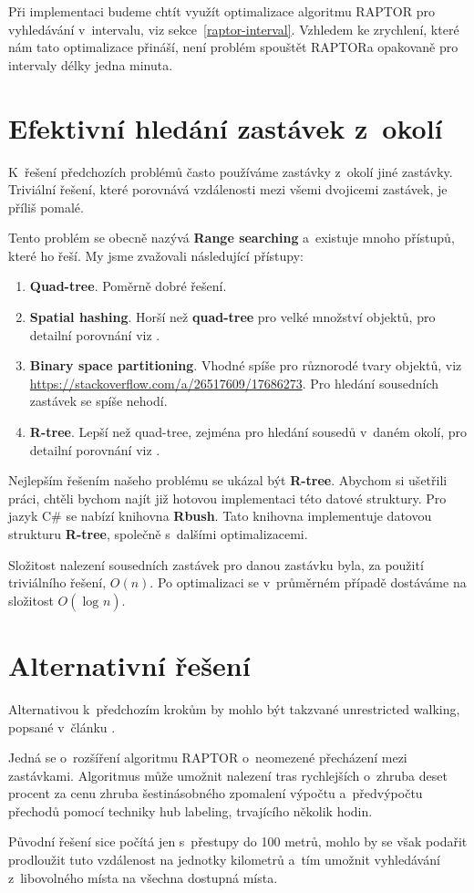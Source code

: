 Při implementaci budeme chtít využít optimalizace algoritmu RAPTOR pro vyhledávání v~intervalu, viz sekce~\ref{raptor-interval}. Vzhledem ke zrychlení, které nám tato optimalizace přináší, není problém spouštět RAPTORa opakovaně pro intervaly délky jedna minuta.


\section{Efektivní hledání zastávek z~okolí}\label{optim-sousedi}

K~řešení předchozích problémů často používáme zastávky z~okolí jiné zastávky. Triviální řešení, které porovnává vzdálenosti mezi všemi dvojicemi zastávek, je příliš pomalé.

Tento problém se obecně nazývá \textbf{Range searching} a~existuje mnoho přístupů, které ho řeší. My jsme zvažovali následující přístupy:
\begin{enumerate}
    \item \textbf{Quad-tree}. Poměrně dobré řešení.
    \item \textbf{Spatial hashing}. Horší než \textbf{quad-tree} pro velké množství objektů, pro detailní porovnání viz \citet{QuadtreeVSSpatial}.
    \item \textbf{Binary space partitioning}. Vhodné spíše pro různorodé tvary objektů, viz \url{https://stackoverflow.com/a/26517609/17686273}. Pro hledání sousedních zastávek se spíše nehodí.
    \item \textbf{R-tree}. Lepší než quad-tree, zejména pro hledání sousedů v~daném okolí, pro detailní porovnání viz \citet{quadTreeVSRTree}.
\end{enumerate}

Nejlepším řešením našeho problému se ukázal být \textbf{R-tree}. Abychom si ušetřili práci, chtěli bychom najít již hotovou implementaci této datové struktury. Pro jazyk C\# se nabízí knihovna \textbf{Rbush}. Tato knihovna implementuje datovou strukturu \textbf{R-tree}, společně s~dalšími optimalizacemi.

Složitost nalezení sousedních zastávek pro danou zastávku byla, za použití triviálního řešení, $O(n)$. Po optimalizaci se v~průměrném případě dostáváme na složitost $O(\log_{}n)$.


\section{Alternativní řešení}

Alternativou k~předchozím krokům by mohlo být takzvané unrestricted walking, popsané v~článku \citet{unrestrictedWalking}.

Jedná se o~rozšíření algoritmu RAPTOR o~neomezené přecházení mezi zastávkami. Algoritmus může umožnit nalezení tras rychlejších o~zhruba deset procent za cenu zhruba šestinásobného zpomalení výpočtu a~předvýpočtu přechodů pomocí techniky hub labeling, trvajícího několik hodin.

Původní řešení sice počítá jen s~přestupy do 100 metrů, mohlo by se však podařit prodloužit tuto vzdálenost na jednotky kilometrů a~tím umožnit vyhledávání z~libovolného místa na všechna dostupná místa.